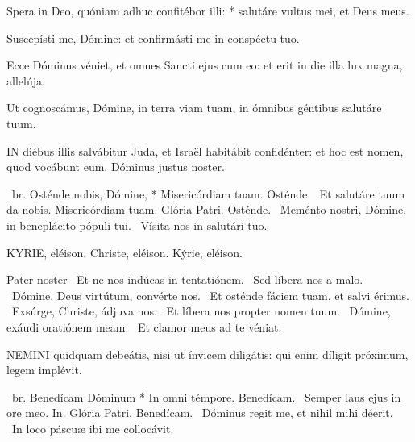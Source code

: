 Spera in Deo, quóniam adhuc confitébor illi: * salutáre vultus mei, et Deus meus.

  Suscepísti me, Dómine: et confirmásti me in conspéctu tuo.


  Ecce Dóminus véniet, et omnes Sancti ejus cum eo: et erit in die illa lux magna, allelúja.

  Ut cognoscámus, Dómine, in terra viam tuam, in ómnibus géntibus salutáre tuum.


\lettrine[lines=2]{I}{N} diébus illis salvábitur Juda, et Israël habitábit confidénter: et hoc est nomen, quod vocábunt eum, Dóminus justus noster.

\R\ br. Osténde nobis, Dómine, * Misericórdiam tuam. Osténde. \V\ Et salutáre tuum da nobis. Misericórdiam tuam. Glória Patri. Osténde. \V\ Meménto nostri, Dómine, in beneplácito pópuli tui. \R\ Vísita nos in salutári tuo.


KYRIE, eléison. Christe, eléison. Kýrie, eléison.

Pater noster  \V\ Et ne nos indúcas in tentatiónem. \R\ Sed líbera nos a malo. \V\ Dómine, Deus virtútum, convérte nos. \R\ Et osténde fáciem tuam, et salvi érimus. \V\ Exsúrge, Christe, ádjuva nos. \R\ Et líbera nos propter nomen tuum. \V\ Dómine, exáudi oratiónem meam. \R\ Et clamor meus ad te véniat.




\lettrine[lines=2]{N}{EMINI} quidquam debeátis, nisi ut ínvicem diligátis: qui enim díligit próximum, legem implévit.

\R\ br. Benedícam Dóminum * In omni témpore. Benedícam. \V\ Semper laus ejus in ore meo. In. Glória Patri. Benedícam. \V\ Dóminus regit me, et nihil mihi déerit. \R\ In loco páscuæ ibi me collocávit.



\sectionornament

